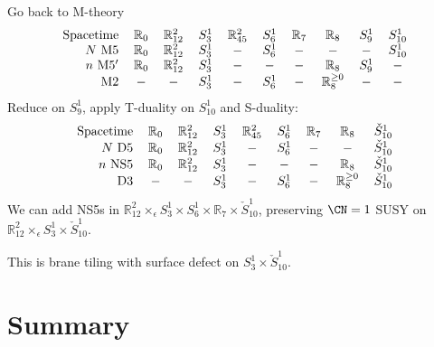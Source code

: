 \documentclass[t]{beamer}
\newcommand{\R}{\mathbb{R}}
\let\eps\epsilon
\begin{document}
\begin{frame}
  Go back to M-theory
  \begin{equation*}
    \begin{tabular}{rcccccccccc}
      Spacetime & $\R_0$ & $\R^2_{12}$ & $S^1_3$ & $\R^2_{45}$ & $S^1_6$
      & $\R_7$ & $\R_8$ & $S^1_9$ & $S^1_{10}$
      \\
      $N$ M5 & $\R_0$ & $\R^2_{12}$ & $S^1_3$ & $-$ & $S^1_6$
      & $-$ & $-$ & $-$ & $S^1_{10}$
     \\
      $n$ M5$'$ & $\R_0$ & $\R^2_{12}$ & $S^1_3$ & $-$
      & $-$ & $-$ & $\R_8$ & $S^1_9$ & $-$
     \\
      M2 & $-$ & $-$ & $S^1_3$ & $-$ & $S^1_6$
      & $-$ & $\R^{\geq 0}_8$ & $-$ & $-$
    \end{tabular}
  \end{equation*}
  Reduce on $S^1_9$, apply T-duality on $S^1_{10}$ and S-duality:
    \begin{equation*}
    \begin{tabular}{rccccccccc}
      Spacetime & $\R_0$ & $\R^2_{12}$ & $S^1_3$ & $\R^2_{45}$ & $S^1_6$
      & $\R_7$ & $\R_8$ & $\check S^1_{10}$
      \\
      $N$ D5 & $\R_0$ & $\R^2_{12}$ & $S^1_3$ & $-$ & $S^1_6$
      & $-$ & $-$ & $\check S^1_{10}$
     \\
      $n$ NS5 & $\R_0$ & $\R^2_{12}$ & $S^1_3$ & $-$
      & $-$ & $-$ & $\R_8$ & $\check S^1_{10}$
     \\
      D3 & $-$ & $-$ & $S^1_3$ & $-$ & $S^1_6$
      & $-$ & $\R^{\geq 0}_8$ & $\check S^1_{10}$
    \end{tabular}
  \end{equation*}
  We can add NS5s in
  $\R^2_{12} \times_\eps S^1_3 \times S^1_6 \times \R_7 \times \check
  S^1_{10}$, preserving $\CN = 1$ SUSY on
  $\R^2_{12} \times_\eps S^1_3 \times \check S^1_{10}$.

  This is brane tiling with surface defect on
  $S^1_3 \times \check S^1_{10}$.
\end{frame}


\section*{Summary}
\end{document}
